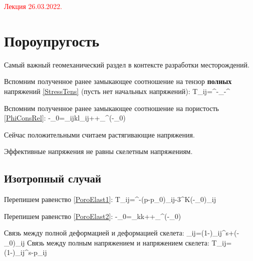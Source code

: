 \documentclass[main.tex]{subfiles}
\begin{document}
\textcolor{red}{Лекция 26.03.2022.}

\section{Пороупругость}

Самый важный геомеханический раздел в контексте разработки месторождений.

Вспомним полученное ранее замыкающее соотношение на тензор \textbf{полных} напряжений \eqref{StressTens} (пусть нет начальных напряжений): 
\beq\label{PoroElast1}
T_{ij}=^{}-_{}-^{}
\eeq

Вспомним полученное ранее замыкающее соотношение на пористость \eqref{PhiConsRel}:
\beq\label{PoroElast2}
\varphi-\varphi_0=\alpha_{ijkl}\varepsilon_{ij}++\alpha_\theta^\varphi\left(\theta-\theta_0\right)
\eeq

Сейчас положительными считаем растягивающие напряжения.

Эффективные напряжения не равны скелетным напряжениям.

\subsection{Изотропный случай}
Перепишем равенство \eqref{PoroElast1}:
\beq
T_{ij}=^{}-\alpha \left(p-p_0\right)\delta_{ij}-3\alpha^{\theta}K\left(\theta-\theta_0\right)\delta_{ij}
\eeq

Перепишем равенство \eqref{PoroElast2}:
\beq
\varphi-\varphi_0=\alpha\varepsilon_{kk}++\alpha_\theta^\varphi\left(\theta-\theta_0\right)
\eeq

Связь между полной деформацией и деформацией скелета:
\beq
\varepsilon_{ij}=\left(1-\varphi\right)\varepsilon_{ij}^s+\left(\varphi-\varphi_0\right)\delta_{ij}
\eeq
Связь между полным напряжением и напряжением скелета:
\beq
T_{ij}=\left(1-\varphi\right)\sigma_{ij}^s-\varphi p\delta_{ij}
\eeq
\end{document}
